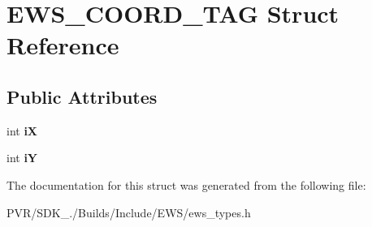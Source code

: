 \hypertarget{struct_e_w_s___c_o_o_r_d___t_a_g}{\section{E\+W\+S\+\_\+\+C\+O\+O\+R\+D\+\_\+\+T\+A\+G Struct Reference}
\label{struct_e_w_s___c_o_o_r_d___t_a_g}
}
\subsection*{Public Attributes}
\begin{DoxyCompactItemize}
\item 
\hypertarget{struct_e_w_s___c_o_o_r_d___t_a_g_a73eeca6692f950a42a845c84fe2afdaf}{int {\bfseries i\+X}}\label{struct_e_w_s___c_o_o_r_d___t_a_g_a73eeca6692f950a42a845c84fe2afdaf}

\item 
\hypertarget{struct_e_w_s___c_o_o_r_d___t_a_g_a31ac1ebbbd6383bcd7162fa990777071}{int {\bfseries i\+Y}}\label{struct_e_w_s___c_o_o_r_d___t_a_g_a31ac1ebbbd6383bcd7162fa990777071}

\end{DoxyCompactItemize}


The documentation for this struct was generated from the following file\+:\begin{DoxyCompactItemize}
\item 
P\+V\+R/\+S\+D\+K\+\_./\+Builds/\+Include/\+E\+W\+S/ews\+\_\+types.\+h\end{DoxyCompactItemize}
